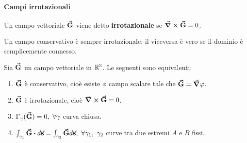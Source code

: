 \paragraph{Campi irrotazionali}
\begin{define}
	Un campo vettoriale $\vb*{\va{G}}$ viene detto \textbf{irrotazionale} se $\curl{\vb*{\va{G}}}=0$.
\end{define}
\begin{propositionqed}
	Un campo conservativo è sempre irrotazionale; il viceversa è vero se il dominio è semplicemente connesso.
\end{propositionqed}
\begin{theoremaqed}
	Sia $\vb*{\va{G}}$ un campo vettoriale in $\mathbb{R}^3$. Le seguenti sono equivalenti:
	\begin{enumerate}[label=\roman*)]
		\item $\vb*{\va{G}}$ è conservativo, cioè esiste $\phi$ campo scalare tale che $\vb*{\va{G}}=\grad{\varphi}$.
		\item $\vb*{\va{G}}$ è irrotazionale, cioè $\curl{\vb*{\va{G}}}=0$.
		\item $\Gamma_{\gamma}(\vb*{\va{G}})=0,\ \forall \gamma$ curva chiusa.
		\item $\int_{\gamma_1}\vba{G}\vdot d\vba{s}=\int_{\gamma_2}\vba{G}d\vba{s},\ \forall \gamma_1,\ \gamma_2$ curve tra due estremi $A$ e $B$ fissi.
	\end{enumerate}
\end{theoremaqed}
